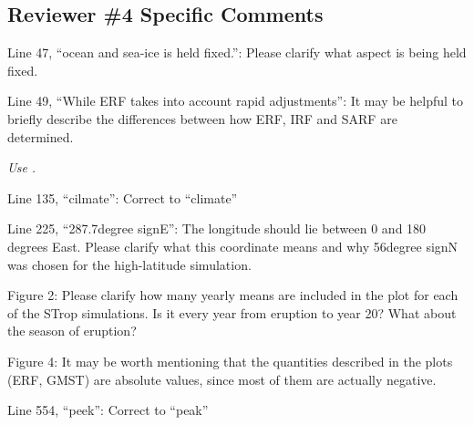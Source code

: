 \documentclass{reviewresponse}
\let\citeA\shortciteA %
\begin{document}
  \subsection*{Reviewer \#4 Specific Comments}
  \begin{revcomment}[colframe={colorcommentresolved}]
    Line 47, ``ocean and sea-ice is held fixed.'': Please clarify what aspect is being
    held fixed.
  \end{revcomment}
  \begin{revcomment}[colframe={colorcommentresolved}]
    Line 49, ``While ERF takes into account rapid adjustments'': It may be helpful to
    briefly describe the differences between how ERF, IRF and SARF are determined.
  \end{revcomment}
  \begin{revresponse}
    \emph{Use \citeA{oconnor2021}.}
  \end{revresponse}
  \begin{revcomment}
    Line 135, ``cilmate'': Correct to ``climate''
  \end{revcomment}
  \begin{revresponse}[Fixed.]
  \end{revresponse}
  \begin{revcomment}[colframe={colorcommentresolved}]
    Line 225, ``287.7{degree sign}E'': The longitude should lie between 0 and 180
    degrees East. Please clarify what this coordinate means and why 56{degree sign}N was
    chosen for the high-latitude simulation.
  \end{revcomment}
  \begin{revcomment}[colframe={colorcommentresolved}]
    Figure 2: Please clarify how many yearly means are included in the plot for each of
    the STrop simulations. Is it every year from eruption to year 20? What about the
    season of eruption?
  \end{revcomment}
  \begin{revcomment}[colframe={colorcommentresolved}]
    Figure 4: It may be worth mentioning that the quantities described in the plots
    (ERF, GMST) are absolute values, since most of them are actually negative.
  \end{revcomment}
  \begin{revcomment}
    Line 554, ``peek'': Correct to ``peak''
  \end{revcomment}
  \begin{revresponse}[Fixed.]
  \end{revresponse}
\end{document}
